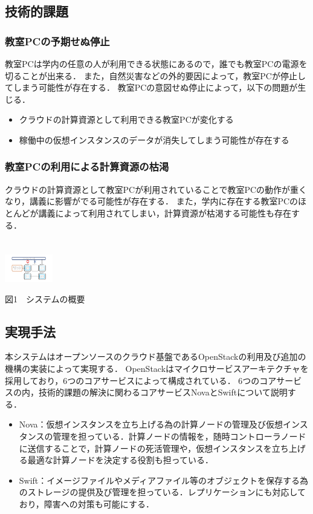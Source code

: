 \documentclass[11pt,a4paper]{jsarticle}
\begin{document}
\subsection{技術的課題}
\subsubsection{教室PCの予期せぬ停止}
教室PCは学内の任意の人が利用できる状態にあるので，誰でも教室PCの電源を切ることが出来る．
また，自然災害などの外的要因によって，教室PCが停止してしまう可能性が存在する．
教室PCの意図せぬ停止によって，以下の問題が生じる．
\begin{itemize}
	\item クラウドの計算資源として利用できる教室PCが変化する
	\item 稼働中の仮想インスタンスのデータが消失してしまう可能性が存在する
\end{itemize}
\subsubsection{教室PCの利用による計算資源の枯渇}
クラウドの計算資源として教室PCが利用されていることで教室PCの動作が重くなり，講義に影響がでる可能性が存在する．
また，学内に存在する教室PCのほとんどが講義によって利用されてしまい，計算資源が枯渇する可能性も存在する．
\\
\\
\\
\includegraphics[width=2.1cm, bb=0 0 300 400]{graph1.pdf}
\begin{center}図1　システムの概要\end{center}

\subsection{実現手法}
本システムはオープンソースのクラウド基盤であるOpenStack\cite{openstack}の利用及び追加の機構の実装によって実現する．
OpenStackはマイクロサービスアーキテクチャを採用しており，6つのコアサービスによって構成されている．
6つのコアサービスの内，技術的課題の解決に関わるコアサービスNovaとSwiftについて説明する．
\begin{itemize}
	\item Nova：仮想インスタンスを立ち上げる為の計算ノードの管理及び仮想インスタンスの管理を担っている．計算ノードの情報を，随時コントローラノードに送信することで，計算ノードの死活管理や，仮想インスタンスを立ち上げる最適な計算ノードを決定する役割も担っている．
	\item Swift：イメージファイルやメディアファイル等のオブジェクトを保存する為のストレージの提供及び管理を担っている．レプリケーションにも対応しており，障害への対策も可能にする．
\end{itemize}
\end{document}
